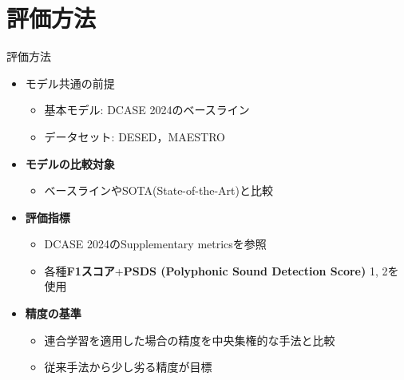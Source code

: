 \documentclass[unicode,12pt,aspectratio=169,dvipdfmx]{beamer}
\begin{document}
\section{評価方法}
\begin{frame}{評価方法}
    \begin{itemize}
        \item モデル共通の前提
        \begin{itemize}
            \item 基本モデル: DCASE 2024のベースライン
            \item データセット: DESED，MAESTRO
        \end{itemize}

        \item \textbf{モデルの比較対象}
        \begin{itemize}
            \item ベースラインやSOTA(State-of-the-Art)と比較
        \end{itemize}
        \item \textbf{評価指標}
        \begin{itemize}
            \item DCASE 2024のSupplementary metricsを参照
            \item 各種\textbf{F1スコア}+\textbf{PSDS (Polyphonic Sound Detection Score)} 1, 2を使用
        \end{itemize}
        \item \textbf{精度の基準}
        \begin{itemize}
            \item 連合学習を適用した場合の精度を中央集権的な手法と比較
            \item 従来手法から少し劣る精度が目標
        \end{itemize}
    \end{itemize}
\end{frame}

  
\end{document}
